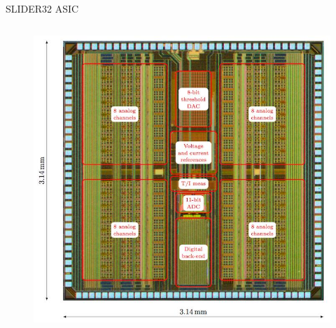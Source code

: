 \documentclass[aspectratio=169,xcolor=dvipsnames,handout]{beamer} %
\begin{document}
\begin{frame}{SLIDER32 ASIC}
\begin{columns}
\begin{figure}
        \vspace{0.2cm}
        \vskip0.001cm
        \includegraphics[height=0.5\textheight]{images/experiment_intro/gaps_asic_circuit.jpg}
        \end{figure}
    \end{columns}
\end{frame}


\end{document}
